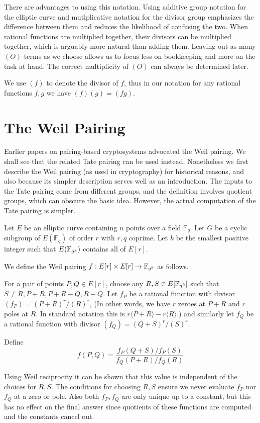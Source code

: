 There are advantages to using this notation. Using additive group
notation for the elliptic curve and mutlplicative notation for the divisor
group emphasizes the difference between them and reduces the likelihood of
confusing the two. When rational functions are multiplied together,
their divisors can be multiplied together, which is arguably
more natural than adding them.
Leaving out as many $(O)$ terms as we choose allows us to focus less on
bookkeeping and more on the task at hand.
The correct multiplicity of $(O)$ can always be determined later.

We use
$(f)$ to denote the divisor of $f$, thus in our notation
for any rational functions $f, g$ we have $(f)(g) = (f g)$.

\section {The Weil Pairing}

Earlier papers on pairing-based cryptosystems advocated the Weil pairing.
We shall see that the related Tate pairing can be used instead.
Nonetheless we first describe the Weil pairing (as used in cryptography)
for historical reasons, and also because its simpler description
serves well as an introduction. The inputs to the Tate pairing come
from different groups, and the definition involves quotient groups,
which can obscure the basic idea. However, the actual computation
of the Tate pairing is simpler.

Let $E$ be an elliptic curve containing $n$ points over a field $\mathbb{F}_q$.
Let $G$ be a cyclic subgroup of $E(\mathbb{F}_q)$ of order $r$ with $r, q$
coprime. Let $k$ be the smallest positive integer such that $E(\mathbb{F}_{q^k})$
contains all of $E[r]$.

We define the Weil pairing
$f:E[r] \times E[r] \rightarrow \mathbb{F}_{q^k}$ as follows.

For a pair of points $P, Q \in E[r]$,
choose any $R, S \in E[\mathbb{F}_{q^k}]$ such that $S \ne R, P+R, P+R - Q, R-Q$.
Let $f_P$ be a rational function with divisor $(f_P) = (P+R)^r /(R)^r$,
(In other words, we have $r$ zeroes at $P+R$ and $r$ poles at $R$.
In standard notation this is $r\langle P+R\rangle  - r\langle R\rangle$.)
and similarly let $f_Q$ be a rational function with divisor
$(f_Q) = (Q+S)^r/(S)^r$.

Define
\[ f(P,Q) = \frac{f_P(Q+S)/f_P(S)}{f_Q(P+R)/f_Q(R)} \]

Using Weil reciprocity it can be shown that this value is independent
of the choices for $R, S$. The conditions for choosing $R, S$ ensure
we never evaluate $f_P$ nor $f_Q$ at a zero or pole.
Also both $f_P, f_Q$ are only unique up to a constant,
but this has no effect on the final answer since quotients
of these functions are computed and the constants cancel out.

